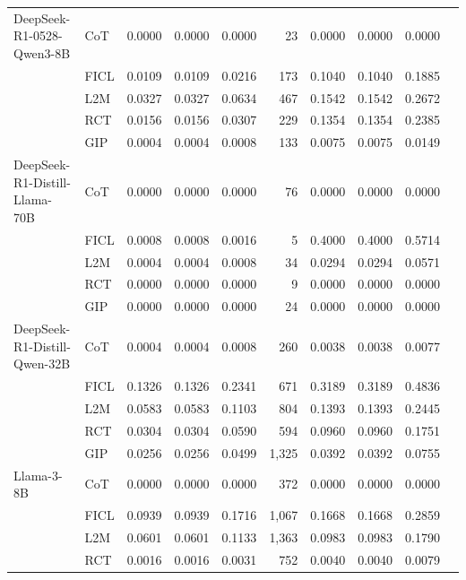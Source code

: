 \documentclass[conference]{IEEEtran}
\begin{document}
\begin{longtable}{p{3.5cm} l r r r r r r r r}
  \midrule
  \endfoot
DeepSeek-R1-0528-Qwen3-8B & CoT  & 0.0000 & 0.0000 & 0.0000 & 23 & 0.0000 & 0.0000 & 0.0000 \\
                          & FICL & 0.0109 & 0.0109 & 0.0216 & 173 & 0.1040 & 0.1040 & 0.1885 \\
                          & L2M  & 0.0327 & 0.0327 & 0.0634 & 467 & 0.1542 & 0.1542 & 0.2672 \\
                          & RCT  & 0.0156 & 0.0156 & 0.0307 & 229 & 0.1354 & 0.1354 & 0.2385 \\
                          & GIP  & 0.0004 & 0.0004 & 0.0008 & 133 & 0.0075 & 0.0075 & 0.0149 \\ \addlinespace
DeepSeek-R1-Distill-Llama-70B & CoT  & 0.0000 & 0.0000 & 0.0000 & 76 & 0.0000 & 0.0000 & 0.0000 \\
                          & FICL & 0.0008 & 0.0008 & 0.0016 & 5 & 0.4000 & 0.4000 & 0.5714 \\
                          & L2M  & 0.0004 & 0.0004 & 0.0008 & 34 & 0.0294 & 0.0294 & 0.0571 \\
                          & RCT  & 0.0000 & 0.0000 & 0.0000 & 9 & 0.0000 & 0.0000 & 0.0000 \\
                          & GIP  & 0.0000 & 0.0000 & 0.0000 & 24 & 0.0000 & 0.0000 & 0.0000 \\ \addlinespace
DeepSeek-R1-Distill-Qwen-32B & CoT  & 0.0004 & 0.0004 & 0.0008 & 260 & 0.0038 & 0.0038 & 0.0077 \\
                          & FICL & 0.1326 & 0.1326 & 0.2341 & 671 & 0.3189 & 0.3189 & 0.4836 \\
                          & L2M  & 0.0583 & 0.0583 & 0.1103 & 804 & 0.1393 & 0.1393 & 0.2445 \\
                          & RCT  & 0.0304 & 0.0304 & 0.0590 & 594 & 0.0960 & 0.0960 & 0.1751 \\
                          & GIP  & 0.0256 & 0.0256 & 0.0499 & 1,325 & 0.0392 & 0.0392 & 0.0755 \\ \addlinespace
Llama-3-8B & CoT  & 0.0000 & 0.0000 & 0.0000 & 372 & 0.0000 & 0.0000 & 0.0000 \\
           & FICL & 0.0939 & 0.0939 & 0.1716 & 1,067 & 0.1668 & 0.1668 & 0.2859 \\
           & L2M  & 0.0601 & 0.0601 & 0.1133 & 1,363 & 0.0983 & 0.0983 & 0.1790 \\
           & RCT  & 0.0016 & 0.0016 & 0.0031 & 752 & 0.0040 & 0.0040 & 0.0079 \\

\end{longtable}
\end{document}
